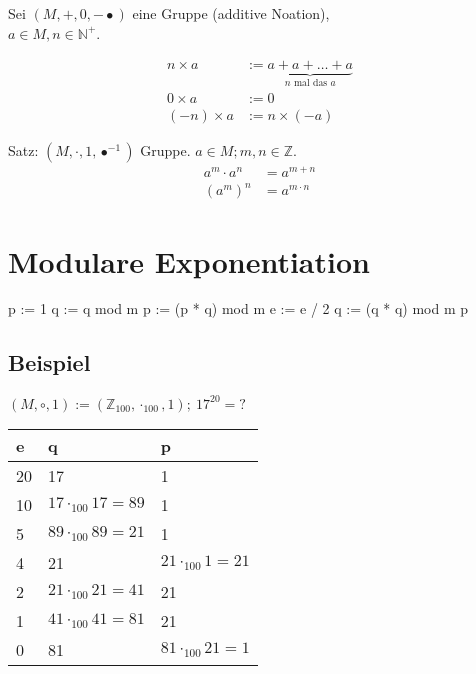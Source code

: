 \documentclass[a4paper, ngerman, landscape, fleqn]{article}
\begin{document}
\begin{multicols*}{3}
Sei $(M, +, 0, -\bullet)$ eine Gruppe (additive Noation),\\ 
$a \in M, n \in \mathbb{N}^+$.

\begin{align*}
    n \times a &:= \underbrace{a + a + \dotsc + a}_{n \text{ mal das } a} \\
    0 \times a &:= 0 \\
    (-n) \times a &:= n \times (-a)
\end{align*}

Satz: $(M, \cdot, 1, \bullet^{-1})$ Gruppe. $a \in M; m, n \in \mathbb{Z}$.
\begin{align*}
    a^m \cdot a^n &= a^{m+n} \\
    \left(a^m\right)^n &= a^{m \cdot n} 
\end{align*}

\section*{Modulare Exponentiation}
\begin{algorithmic}
        \State p := 1
        \State q := q mod m
                \State p := (p * q) mod m
            \EndIf
            \State e := e / 2
            \State q := (q * q) mod m
        \EndWhile
        \State \Return p
    \EndFunction
\end{algorithmic}

\subsection*{Beispiel}

$(M, \circ, 1) := (\mathbb{Z}_{100}, \cdot_{100}, 1);\ 17^{20} = ?$

\vspace{1ex}

\begin{tabularx}{\linewidth}{YYY}
    \hline
     e & q & p \\
     & 17 & 1 \\
    10 & $17 \cdot_{100} 17 = 89$ & 1 \\
    5 & $89 \cdot_{100} 89 = 21$ & 1 \\
    4 & 21 & $21 \cdot_{100} 1 = 21$ \\
    2 & $21 \cdot_{100} 21 = 41$ & 21 \\
    1 & $41 \cdot_{100} 41 = 81$ & 21 \\
    0 & 81 & $81 \cdot_{100} 21 = 1$ \\
    \hline
\end{tabularx}

\end{multicols*}
\end{document}
